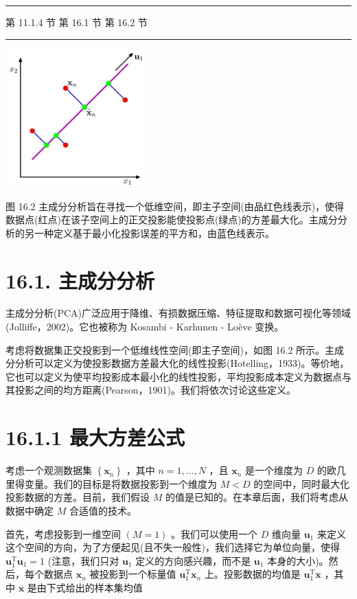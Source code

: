 \documentclass[10pt]{report}
\newcommand{\HRule}{\begin{center}\rule{0.9\linewidth}{0.2mm}\end{center}}
\begin{document}
\HRule

第 11.1.4 节 第 16.1 节 第 16.2 节

\HRule

\begin{center}
\includegraphics[max width=0.4\textwidth]{images/0194e279-9b28-703a-88f4-c3ac21e2010d_516_1048_344_500_497_0.jpg}
\end{center}
\hspace*{3em} 

图 16.2 主成分分析旨在寻找一个低维空间，即主子空间(由品红色线表示)，使得数据点(红点)在该子空间上的正交投影能使投影点(绿点)的方差最大化。主成分分析的另一种定义基于最小化投影误差的平方和，由蓝色线表示。

\section*{16.1. 主成分分析}

主成分分析(PCA)广泛应用于降维、有损数据压缩、特征提取和数据可视化等领域(Jolliffe，2002)。它也被称为 Kosambi - Karhunen - Loève 变换。

考虑将数据集正交投影到一个低维线性空间(即主子空间)，如图 16.2 所示。主成分分析可以定义为使投影数据方差最大化的线性投影(Hotelling，1933)。等价地，它也可以定义为使平均投影成本最小化的线性投影，平均投影成本定义为数据点与其投影之间的均方距离(Pearson，1901)。我们将依次讨论这些定义。

\section*{16.1.1 最大方差公式}

考虑一个观测数据集 \(\left\{  {\mathbf{x}}_{n}\right\}\) ，其中 \(n = 1,\ldots ,N\) ，且 \({\mathbf{x}}_{n}\) 是一个维度为 \(D\) 的欧几里得变量。我们的目标是将数据投影到一个维度为 \(M < D\) 的空间中，同时最大化投影数据的方差。目前，我们假设 \(M\) 的值是已知的。在本章后面，我们将考虑从数据中确定 \(M\) 合适值的技术。

首先，考虑投影到一维空间 \(\left( {M = 1}\right)\) 。我们可以使用一个 \(D\) 维向量 \({\mathbf{u}}_{1}\) 来定义这个空间的方向，为了方便起见(且不失一般性)，我们选择它为单位向量，使得 \({\mathbf{u}}_{1}^{\mathrm{T}}{\mathbf{u}}_{1} = 1\) (注意，我们只对 \({\mathbf{u}}_{1}\) 定义的方向感兴趣，而不是 \({\mathbf{u}}_{1}\) 本身的大小)。然后，每个数据点 \({\mathbf{x}}_{n}\) 被投影到一个标量值 \({\mathbf{u}}_{1}^{\mathrm{T}}{\mathbf{x}}_{n}\) 上。投影数据的均值是 \({\mathbf{u}}_{1}^{\mathrm{T}}\overline{\mathbf{x}}\) ，其中 \(\overline{\mathbf{x}}\) 是由下式给出的样本集均值
\end{document}
